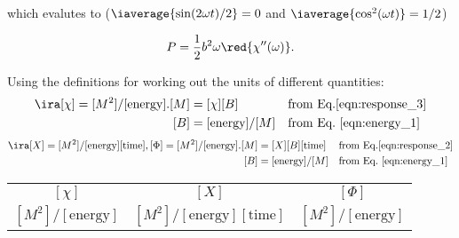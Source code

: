  \noindent which evalutes to ($  \iaverage{\sin(2\omega t)/2} = 0 $ and
 $ \iaverage{\cos^2(\omega t)} = 1/2 $)


 \begin{framed}\noindent
   \begin{equation}\label{eqn:energy_2}
     P = \frac{1}{2}b^2\omega\red{\chi''(\omega)}.
   \end{equation}
   \textbf{}

\end{framed}
Using  the  definitions   for  working  out  the   units  of  different
quantities:
\begin{equation}
  \begin{aligned} \ira [\chi] = [M^2]/[\text{energy}].
    [M] &= [\chi][B] &&\text{from Eq.\eqref{eqn:response_3}}\\
    [B] & = [\text{energy}]/[M] &&\text{from Eq.~\eqref{eqn:energy_1}}
  \end{aligned}
\end{equation}
\begin{equation}\label{eqn:unit1}
  \begin{aligned} \ira [X] = [M^2]/[\text{energy}][\text{time}], [\Phi] = [M^2]/[\text{energy}].
    [M] &= [X][B][\text{time}] &&\text{from Eq.\eqref{eqn:response_2}}\\
    [B] & = [\text{energy}]/[M] &&\text{from Eq.~\eqref{eqn:energy_1}}
  \end{aligned}
\end{equation}


\begin{center}
  \begin{tabular}{|c|c|c|}
    \hline
    $ [\chi] $ & $ [X] $ & $ [\Phi] $\\
    $ [M^2]/[\text{energy}] $&$ [M^2]/[\text{energy}][\text{time}] $ & $ [M^2]/[\text{energy}] $\\\hline
  \end{tabular}
\end{center}

